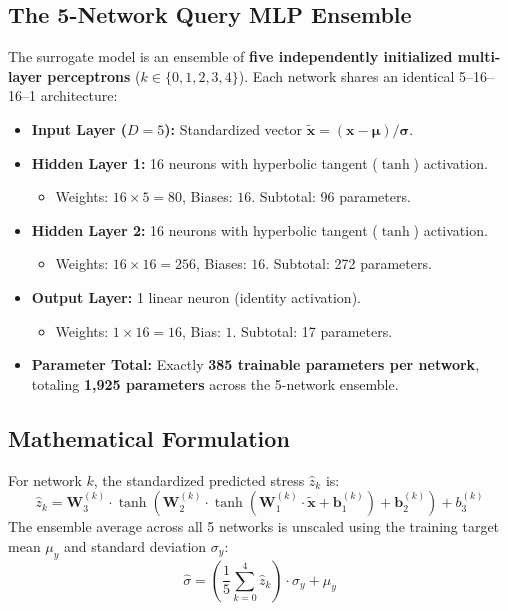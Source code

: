 \documentclass[11pt,a4paper]{article}
\begin{document}
\subsection{The 5-Network Query MLP Ensemble}
The surrogate model is an ensemble of \textbf{five independently initialized multi-layer perceptrons} ($k \in \{0, 1, 2, 3, 4\}$). Each network shares an identical 5--16--16--1 architecture:
\begin{itemize}
    \item \textbf{Input Layer ($D=5$):} Standardized vector $\tilde{\mathbf{x}} = (\mathbf{x} - \boldsymbol{\mu}) / \boldsymbol{\sigma}$.
    \item \textbf{Hidden Layer 1:} 16 neurons with hyperbolic tangent ($\tanh$) activation.
    \begin{itemize}
        \item Weights: $16 \times 5 = 80$, Biases: $16$. Subtotal: 96 parameters.
    \end{itemize}
    \item \textbf{Hidden Layer 2:} 16 neurons with hyperbolic tangent ($\tanh$) activation.
    \begin{itemize}
        \item Weights: $16 \times 16 = 256$, Biases: $16$. Subtotal: 272 parameters.
    \end{itemize}
    \item \textbf{Output Layer:} 1 linear neuron (identity activation).
    \begin{itemize}
        \item Weights: $1 \times 16 = 16$, Bias: $1$. Subtotal: 17 parameters.
    \end{itemize}
    \item \textbf{Parameter Total:} Exactly \textbf{385 trainable parameters per network}, totaling \textbf{1,925 parameters} across the 5-network ensemble.
\end{itemize}

\subsection{Mathematical Formulation}
For network $k$, the standardized predicted stress $\hat{z}_k$ is:
\begin{equation}
    \hat{z}_k = \mathbf{W}_3^{(k)} \cdot \tanh\left( \mathbf{W}_2^{(k)} \cdot \tanh\left( \mathbf{W}_1^{(k)} \cdot \tilde{\mathbf{x}} + \mathbf{b}_1^{(k)} \right) + \mathbf{b}_2^{(k)} \right) + b_3^{(k)}
\end{equation}
The ensemble average across all 5 networks is unscaled using the training target mean $\mu_y$ and standard deviation $\sigma_y$:
\begin{equation}
    \hat{\sigma} = \left( \frac{1}{5} \sum_{k=0}^4 \hat{z}_k \right) \cdot \sigma_y + \mu_y
\end{equation}
\end{document}
